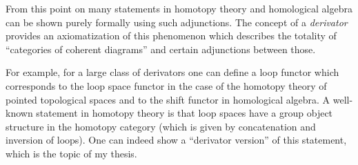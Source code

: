 From this point on many statements in homotopy theory and homological
algebra can be shown purely formally using such adjunctions. The concept of a
\emph{derivator} provides an axiomatization of this phenomenon
which describes the totality of ``categories of coherent diagrams'' and
certain adjunctions between those.

For example, for a large class of derivators one can define a loop
functor which corresponds to the loop space functor in the case of the
homotopy theory of pointed topological spaces and to the shift functor
in homological algebra. A well-known statement in homotopy theory
is that loop spaces have a group object structure in the homotopy category
(which is given by concatenation and inversion of loops). One can indeed
show a ``derivator version'' of this statement, which is the topic
of my thesis.
